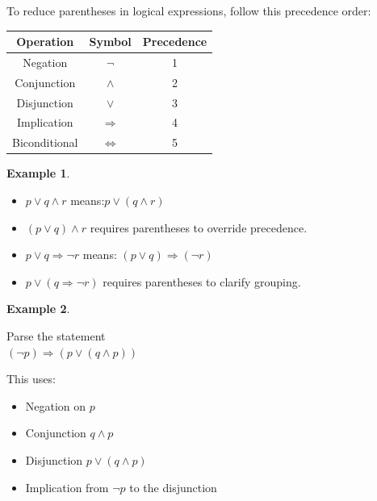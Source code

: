 \documentclass[
]{book}
\providecommand{\tightlist}{%
  \setlength{\itemsep}{0pt}\setlength{\parskip}{0pt}}
\theoremstyle{definition}
\theoremstyle{definition}
\newtheorem{example}{Example}[chapter]
\theoremstyle{definition}
\theoremstyle{definition}
\theoremstyle{remark}
\begin{document}
To reduce parentheses in logical expressions, follow this precedence order:

\begin{longtable}[]{@{}ccc@{}}
\toprule\noalign{}
Operation & Symbol & Precedence \\
\midrule\noalign{}
\endhead
\bottomrule\noalign{}
\endlastfoot
Negation & \(\neg\) & 1 \\
Conjunction & \(\land\) & 2 \\
Disjunction & \(\lor\) & 3 \\
Implication & \(\Rightarrow\) & 4 \\
Biconditional & \(\Leftrightarrow\) & 5 \\
\end{longtable}

\begin{example}
\protect\hypertarget{exm:unnamed-chunk-30}{}\label{exm:unnamed-chunk-30}\leavevmode

\begin{itemize}
\item
  \(p \lor q \land r\) means:\(p \lor (q \land r)\)
\item
  \((p \lor q) \land r\) requires parentheses to override precedence.
\item
  \(p \lor q \Rightarrow \neg r\) means: \((p \lor q) \Rightarrow (\neg r)\)
\item
  \(p \lor (q \Rightarrow \neg r)\) requires parentheses to clarify grouping.
\end{itemize}

\end{example}

\begin{example}
\protect\hypertarget{exm:unnamed-chunk-31}{}\label{exm:unnamed-chunk-31}

Parse the statement\\
\((\neg p) \Rightarrow (p \lor (q \land p))\)

This uses:

\begin{itemize}
\tightlist
\item
  Negation on \(p\)
\item
  Conjunction \(q \land p\)
\item
  Disjunction \(p \lor (q \land p)\)
\item
  Implication from \(\neg p\) to the disjunction
\end{itemize}

\end{example}
\end{document}
